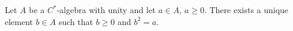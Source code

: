 Let $A$ be a $C^*$-algebra with unity and let $a \in A$, $a \geq 0$. There exists a unique element $b \in A$ such that $b \geq 0$ and $b^2 = a$.
